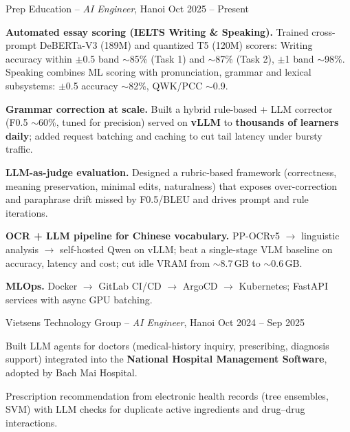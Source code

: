 \begin{cventries}
  \cventry
    {Prep Education -- \textnormal{\textit{AI Engineer}, Hanoi}}
    {Oct 2025 -- Present}
    {
      \begin{cvitems}
        \item {\textbf{Automated essay scoring (IELTS Writing \& Speaking).} Trained cross-prompt DeBERTa-V3 (189M) and quantized T5 (120M) scorers: Writing accuracy within $\pm$0.5 band $\sim$85\% (Task 1) and $\sim$87\% (Task 2), $\pm$1 band $\sim$98\%. Speaking combines ML scoring with pronunciation, grammar and lexical subsystems: $\pm$0.5 accuracy $\sim$82\%, QWK/PCC $\sim$0.9.}
        \item {\textbf{Grammar correction at scale.} Built a hybrid rule-based + LLM corrector (F0.5 $\sim$60\%, tuned for precision) served on \textbf{vLLM} to \textbf{thousands of learners daily}; added request batching and caching to cut tail latency under bursty traffic.}
        \item {\textbf{LLM-as-judge evaluation.} Designed a rubric-based framework (correctness, meaning preservation, minimal edits, naturalness) that exposes over-correction and paraphrase drift missed by F0.5/BLEU and drives prompt and rule iterations.}
        \item {\textbf{OCR + LLM pipeline for Chinese vocabulary.} PP-OCRv5 $\rightarrow$ linguistic analysis $\rightarrow$ self-hosted Qwen on vLLM; beat a single-stage VLM baseline on accuracy, latency and cost; cut idle VRAM from $\sim$8.7\,GB to $\sim$0.6\,GB.}
        \item {\textbf{MLOps.} Docker $\rightarrow$ GitLab CI/CD $\rightarrow$ ArgoCD $\rightarrow$ Kubernetes; FastAPI services with async GPU batching.}
      \end{cvitems}
    }

\vspace{8pt}

  \cventry
    {Vietsens Technology Group -- \textnormal{\textit{AI Engineer}, Hanoi}}
    {Oct 2024 -- Sep 2025}
    {
      \begin{cvitems}
        \item {Built LLM agents for doctors (medical-history inquiry, prescribing, diagnosis support) integrated into the \textbf{National Hospital Management Software}, adopted by Bach Mai Hospital.}
        \item {Prescription recommendation from electronic health records (tree ensembles, SVM) with LLM checks for duplicate active ingredients and drug--drug interactions.}
      \end{cvitems}
    }


\end{cventries}
